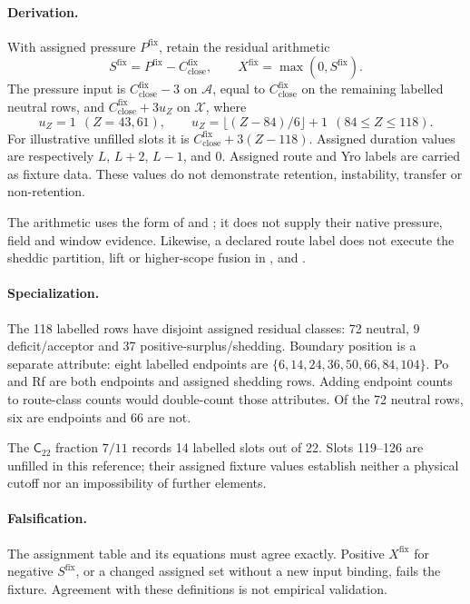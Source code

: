 \paragraph{Derivation.}
With assigned pressure \(P^{\mathrm{fix}}\), retain the residual arithmetic
\begin{equation}
S^{\mathrm{fix}}=P^{\mathrm{fix}}-C^{\mathrm{fix}}_{\mathrm{close}},
\qquad
X^{\mathrm{fix}}=\max(0,S^{\mathrm{fix}}).
\label{eq:matter1-rung-residual-shedding}
\end{equation}
The pressure input is \(C^{\mathrm{fix}}_{\mathrm{close}}-3\) on \(\mathcal A\), equal to \(C^{\mathrm{fix}}_{\mathrm{close}}\) on the remaining labelled neutral rows, and \(C^{\mathrm{fix}}_{\mathrm{close}}+3u_Z\) on \(\mathcal X\), where
\[
u_Z=1\ \ (Z=43,61),\qquad
u_Z=\lfloor(Z-84)/6\rfloor+1\ \ (84\le Z\le118).
\]
For illustrative unfilled slots it is \(C^{\mathrm{fix}}_{\mathrm{close}}+3(Z-118)\). Assigned duration values are respectively \(L\), \(L+2\), \(L-1\), and \(0\). Assigned route and Yro labels are carried as fixture data. These values do not demonstrate retention, instability, transfer or non-retention.

The arithmetic uses the form of  and ; it does not supply their native pressure, field and window evidence. Likewise, a declared route label does not execute the sheddic partition, lift or higher-scope fusion in ,  and .

\paragraph{Specialization.}
The 118 labelled rows have disjoint assigned residual classes: 72 neutral, 9 deficit/acceptor and 37 positive-surplus/shedding. Boundary position is a separate attribute: eight labelled endpoints are \(\{6,14,24,36,50,66,84,104\}\). Po and Rf are both endpoints and assigned shedding rows. Adding endpoint counts to route-class counts would double-count those attributes. Of the 72 neutral rows, six are endpoints and 66 are not.

The \(\mathsf C_{22}\) fraction \(7/11\) records 14 labelled slots out of 22. Slots 119--126 are unfilled in this reference; their assigned fixture values establish neither a physical cutoff nor an impossibility of further elements.

\paragraph{Falsification.}
The assignment table and its equations must agree exactly. Positive \(X^{\mathrm{fix}}\) for negative \(S^{\mathrm{fix}}\), or a changed assigned set without a new input binding, fails the fixture. Agreement with these definitions is not empirical validation.

